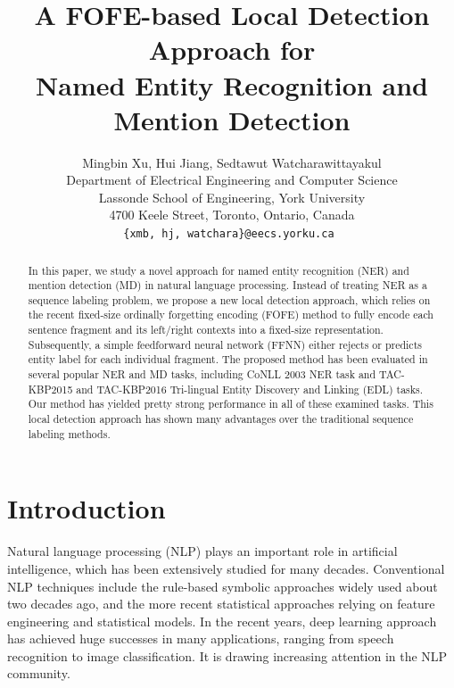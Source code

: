 \documentclass[11pt,a4paper]{article}
\title{A FOFE-based Local Detection Approach for \\
	Named Entity Recognition and Mention Detection}
\author{Mingbin Xu, Hui Jiang, Sedtawut Watcharawittayakul \\
	Department of Electrical Engineering and Computer Science \\
	Lassonde School of Engineering, York University \\
	4700 Keele Street, Toronto, Ontario, Canada\\
	{\tt \{xmb, hj, watchara\}@eecs.yorku.ca }
}
\date{}
\begin{document}
\maketitle


\begin{abstract}
	In this paper, we study a novel approach for named entity recognition (NER) and mention detection (MD) in natural language processing. Instead of treating NER as a sequence labeling problem, we propose a new local detection approach, which relies on the recent fixed-size ordinally forgetting encoding (FOFE) method to fully encode each sentence fragment and its left/right contexts into a fixed-size representation. Subsequently, a simple feedforward neural network (FFNN) either rejects or predicts entity label for each individual fragment. The proposed method has been evaluated in several popular NER and MD tasks, including CoNLL 2003 NER task and  TAC-KBP2015 and TAC-KBP2016 Tri-lingual Entity Discovery and Linking (EDL) tasks. Our method has yielded pretty strong performance in all of these examined tasks. This local detection approach has shown many advantages over the traditional sequence labeling  methods.
\end{abstract}


\section{Introduction}
\label{sec:intro}

Natural language processing (NLP) plays an important role in artificial intelligence, which has been extensively studied for many decades. Conventional NLP techniques include the rule-based symbolic approaches widely used about two decades ago, and the more recent statistical approaches relying on feature engineering and statistical models. In the recent years, deep learning approach has achieved huge successes in many applications, ranging from speech recognition to image classification. It is drawing increasing attention in the NLP community. 
\end{document}

